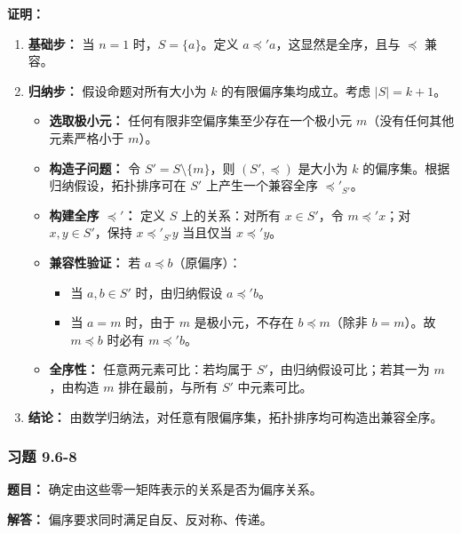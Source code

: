 \documentclass[11pt,UTF8]{article}
\begin{document}
\textbf{证明：}
\begin{enumerate}[1.]
    \item \textbf{基础步：} 当 $n=1$ 时，$S=\{a\}$。定义 $a \preceq' a$，这显然是全序，且与 $\preceq$ 兼容。
    
    \item \textbf{归纳步：} 假设命题对所有大小为 $k$ 的有限偏序集均成立。考虑 $|S|=k+1$。
    \begin{itemize}
        \item \textbf{选取极小元：} 任何有限非空偏序集至少存在一个极小元 $m$（没有任何其他元素严格小于 $m$）。
        \item \textbf{构造子问题：} 令 $S' = S \setminus \{m\}$，则 $(S', \preceq)$ 是大小为 $k$ 的偏序集。根据归纳假设，拓扑排序可在 $S'$ 上产生一个兼容全序 $\preceq'_{S'}$。
        \item \textbf{构建全序 $\preceq'$：} 定义 $S$ 上的关系：对所有 $x \in S'$，令 $m \preceq' x$；对 $x,y \in S'$，保持 $x \preceq'_{S'} y$ 当且仅当 $x \preceq' y$。
        \item \textbf{兼容性验证：} 若 $a \preceq b$（原偏序）：
        \begin{itemize}
            \item 当 $a,b \in S'$ 时，由归纳假设 $a \preceq' b$。
            \item 当 $a=m$ 时，由于 $m$ 是极小元，不存在 $b \preceq m$（除非 $b=m$）。故 $m \preceq b$ 时必有 $m \preceq' b$。
        \end{itemize}
        \item \textbf{全序性：} 任意两元素可比：若均属于 $S'$，由归纳假设可比；若其一为 $m$，由构造 $m$ 排在最前，与所有 $S'$ 中元素可比。
    \end{itemize}
    
    \item \textbf{结论：} 由数学归纳法，对任意有限偏序集，拓扑排序均可构造出兼容全序。
\end{enumerate}

\subsubsection*{习题 9.6-8}
\textbf{题目：} 确定由这些零一矩阵表示的关系是否为偏序关系。

\textbf{解答：} 偏序要求同时满足自反、反对称、传递。
\end{document}
